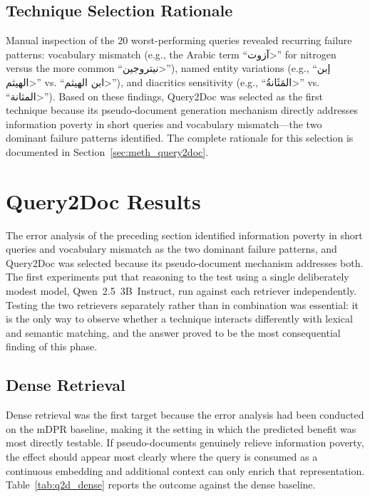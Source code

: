 \subsection{Technique Selection Rationale}
\label{sec:res_error_rationale}

Manual inspection of the 20 worst-performing queries revealed recurring failure patterns: vocabulary mismatch (e.g., the Arabic term ``\<آزوت>'' for nitrogen versus the more common ``\<نيتروجين>''), named entity variations (e.g., ``\<إبن الهيثم>'' vs. ``\<ابن الهيثم>''), and diacritics sensitivity (e.g., ``\<المَثَانةُ>'' vs. ``\<المثانة>''). Based on these findings, Query2Doc \cite{wang_2023_query2doc} was selected as the first technique because its pseudo-document generation mechanism directly addresses information poverty in short queries and vocabulary mismatch---the two dominant failure patterns identified. The complete rationale for this selection is documented in Section~\ref{sec:meth_query2doc}.

\section{Query2Doc Results}
\label{sec:res_query2doc}

The error analysis of the preceding section identified information poverty in short queries and vocabulary mismatch as the two dominant failure patterns, and Query2Doc was selected because its pseudo-document mechanism addresses both. The first experiments put that reasoning to the test using a single deliberately modest model, Qwen~2.5~3B~Instruct, run against each retriever independently. Testing the two retrievers separately rather than in combination was essential: it is the only way to observe whether a technique interacts differently with lexical and semantic matching, and the answer proved to be the most consequential finding of this phase.

\subsection{Dense Retrieval}
\label{sec:res_q2d_dense}

Dense retrieval was the first target because the error analysis had been conducted on the mDPR baseline, making it the setting in which the predicted benefit was most directly testable. If pseudo-documents genuinely relieve information poverty, the effect should appear most clearly where the query is consumed as a continuous embedding and additional context can only enrich that representation. Table~\ref{tab:q2d_dense} reports the outcome against the dense baseline.

